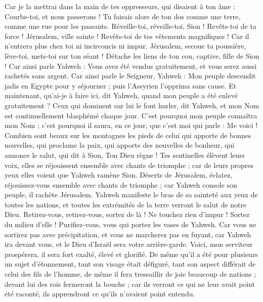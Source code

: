 \begin{multicols}{2}
Car je la mettrai dans la main de tes oppresseurs, qui disaient à ton âme : Courbe-toi, et nous passerons ! Tu faisais alors de ton dos comme une terre, comme une rue pour les passants.
\VerseOne{}Réveille-toi, réveille-toi, Sion ! Revêts-toi de ta force ! Jérusalem, ville sainte ! Revêts-toi de tes vêtements magnifiques ! Car il n'entrera plus chez toi ni incirconcis ni impur.
Jérusalem, secoue ta poussière, lève-toi, mets-toi sur ton séant ! Détache les liens de ton cou, captive, fille de Sion !
Car ainsi parle Yahweh : Vous avez été vendus gratuitement, et vous serez aussi rachetés sans argent.
Car ainsi parle le Seigneur, Yahweh : Mon peuple descendit jadis en Egypte pour y séjourner ; puis l'Assyrien l'opprima sans cause.
Et maintenant, qu'ai-je à faire ici, dit Yahweh, quand mon peuple a été enlevé gratuitement ? Ceux qui dominent sur lui le font hurler, dit Yahweh, et mon Nom est continuellement blasphémé chaque jour.
C'est pourquoi mon peuple connaîtra mon Nom ; c'est pourquoi il saura, en ce jour, que c'est moi qui parle : Me voici !
Combien sont beaux sur les montagnes les pieds de celui qui apporte de bonnes nouvelles, qui proclame la paix, qui apporte des nouvelles de bonheur, qui annonce le salut, qui dit à Sion, Ton Dieu règne !
Tes sentinelles élèvent leurs voix, elles se réjouissent ensemble avec chants de triomphe ; car de leurs propres yeux elles voient que Yahweh ramène Sion.
Déserts de Jérusalem, éclatez, réjouissez-vous ensemble avec chants de triomphe ; car Yahweh console son peuple, il rachète Jérusalem.
Yahweh manifeste le bras de sa sainteté aux yeux de toutes les nations, et toutes les extrémités de la terre verront le salut de notre Dieu.
Retirez-vous, retirez-vous, sortez de là ! Ne touchez rien d'impur ! Sortez du milieu d'elle ! Purifiez-vous, vous qui portez les vases de Yahweh.
Car vous ne sortirez pas avec précipitation, et vous ne marcherez pas en fuyant, car Yahweh ira devant vous, et le Dieu d'Israël sera votre arrière-garde.
Voici, mon serviteur prospérera, il sera fort exalté, élevé et glorifié.
De même qu'il a été pour plusieurs un sujet d'étonnement, tant son visage était défiguré, tant son aspect différait de celui des fils de l'homme,
de même il fera tressaillir de joie beaucoup de nations ; devant lui des rois fermeront la bouche ; car ils verront ce qui ne leur avait point été raconté, ils apprendront ce qu'ils n'avaient point entendu.

\end{multicols}

